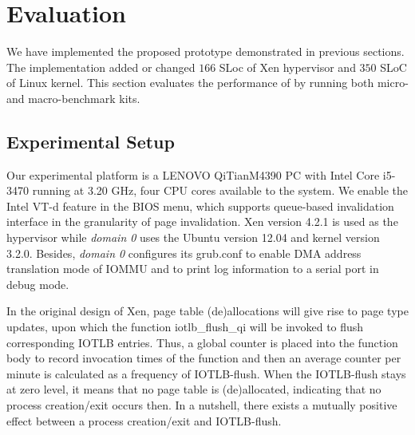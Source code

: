
\section{Evaluation} \label{sec:eva}
%
We have implemented the proposed prototype demonstrated in previous sections. The implementation added or changed %
$166$ SLoc of Xen hypervisor and $350$ SLoC of Linux kernel.
This section evaluates the performance of \name by running both micro- and macro-benchmark kits.

\subsection{Experimental Setup}

Our experimental platform is a LENOVO QiTianM4390 PC with Intel Core i5-3470 running at 3.20 GHz, four CPU cores available to the system. We enable the Intel VT-d feature in the BIOS menu, which supports queue-based invalidation interface in the granularity of page invalidation. Xen version 4.2.1 is used as the hypervisor while \emph{domain 0} uses the Ubuntu version 12.04 and kernel version 3.2.0. Besides, \emph{domain 0} configures its grub.conf to enable DMA address translation mode of IOMMU and to print log information to a serial port in debug mode.

In the original design of Xen, page table (de)allocations will give rise to page type updates, upon which the function iotlb\_flush\_qi will be invoked to flush corresponding IOTLB entries. Thus, a global counter is placed into the function body to record invocation times of the function and then an average counter per minute is calculated as a frequency of IOTLB-flush. When the IOTLB-flush stays at zero level, it means that no page table is (de)allocated, indicating that no process creation/exit occurs then. In a nutshell, there exists a mutually positive effect between a process creation/exit and IOTLB-flush.

